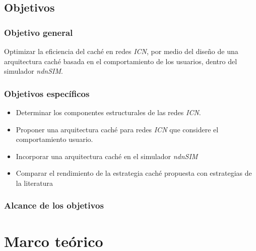 \documentclass[12pt]{ociamthesis}  %
\begin{document}
\section{Objetivos}
\subsection{Objetivo general}
Optimizar la eficiencia del caché en redes \textit{ICN}, por medio del diseño de una arquitectura caché basada en el comportamiento de los usuarios, dentro del simulador \textit{ndnSIM}.

\subsection{Objetivos específicos}
\begin{itemize}
	\item Determinar los componentes estructurales de las redes \textit{ICN}.
	\item Proponer una arquitectura caché para redes \textit{ICN} que considere el comportamiento usuario.
	\item Incorporar una arquitectura caché en el simulador \textit{ndnSIM}
	\item Comparar el rendimiento de la estrategia caché propuesta con estrategias de la literatura
\end{itemize}

\subsection{Alcance de los objetivos}

\chapter{Marco teórico}
\end{document}
